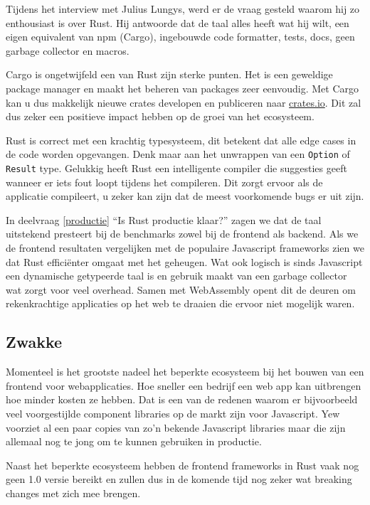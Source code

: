 Tijdens het interview met Julius Lungys, werd er de vraag gesteld waarom hij zo enthousiast is over
Rust. Hij antwoorde dat de taal alles heeft wat hij wilt, een eigen equivalent van npm (Cargo),
ingebouwde code formatter, tests, docs, geen garbage collector en macros.

Cargo is ongetwijfeld een van Rust zijn sterke punten. Het is een geweldige package manager en maakt
het beheren van packages zeer eenvoudig. Met Cargo kan u dus makkelijk nieuwe crates developen en
publiceren naar \url{crates.io}. Dit zal dus zeker een positieve impact hebben op de groei van het
ecosysteem.

Rust is correct met een krachtig typesysteem, dit betekent dat alle edge cases in de code worden
opgevangen. Denk maar aan het unwrappen van een \texttt{Option} of
\texttt{Result} type. Gelukkig heeft Rust een intelligente compiler die suggesties geeft
wanneer er iets fout loopt tijdens het compileren. Dit zorgt ervoor als de applicatie compileert, u
zeker kan zijn dat de meest voorkomende bugs er uit zijn.

In deelvraag \ref{productie} \enquote{Is Rust productie klaar?} zagen we dat de taal uitstekend
presteert bij de benchmarks zowel bij de frontend als backend. Als we de frontend resultaten
vergelijken met de populaire Javascript frameworks zien we dat Rust efficiënter omgaat met het
geheugen. Wat ook logisch is sinds Javascript een dynamische getypeerde taal is en gebruik maakt van
een garbage collector wat zorgt voor veel overhead. Samen met WebAssembly opent dit de deuren om
rekenkrachtige applicaties op het web te draaien die ervoor niet mogelijk waren.

\subsection{Zwakke}

Momenteel is het grootste nadeel het beperkte ecosysteem bij het bouwen van een frontend voor
webapplicaties. Hoe sneller een bedrijf een web app kan uitbrengen hoe minder kosten ze hebben. Dat
is een van de redenen waarom er bijvoorbeeld veel voorgestijlde component libraries op de markt zijn
voor Javascript. Yew voorziet al een paar copies van zo'n bekende Javascript libraries maar die zijn
allemaal nog te jong om te kunnen gebruiken in productie.

Naast het beperkte ecosysteem hebben de frontend frameworks in Rust vaak nog geen 1.0 versie bereikt
en zullen dus in de komende tijd nog zeker wat breaking changes met zich mee brengen.

